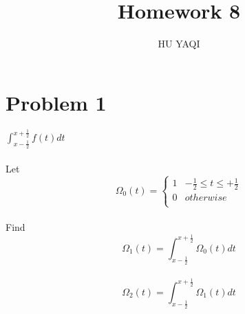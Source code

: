 \documentclass{article}
\title{ Homework 8 }
\author{HU YAQI}
\begin{document}
\maketitle
\setlength{\parindent}{0pt}

\section{ Problem 1 }
$\int_{x-\frac{1}{2}}^{x+\frac{1}{2}} f(t) dt$\\
\\
Let $$\Omega_0(t)=
\left \{
\begin{array}{lr}
1 & -\frac{1}{2}\leq t \leq +\frac{1}{2} \\
0 & otherwise\\
\end{array}
\right.
$$
\\
Find $$\Omega_1(t)=
\int_{x-\frac{1}{2}}^{x+\frac{1}{2}} \Omega_0(t) dt
$$
\\
$$\Omega_2(t)=
\int_{x-\frac{1}{2}}^{x+\frac{1}{2}} \Omega_1(t) dt
$$
\end{document}
